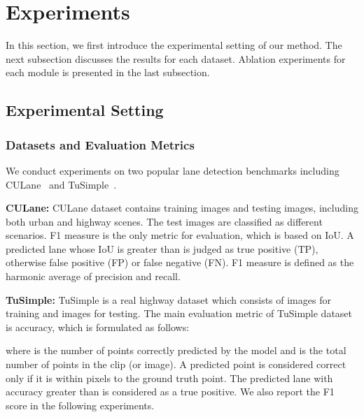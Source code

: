 \documentclass[10pt,twocolumn,letterpaper]{article}
\begin{document}
\section{Experiments}

In this section, we first introduce the experimental setting of our method. The next subsection discusses the results for each dataset. Ablation experiments for each module is presented in the last subsection.
\subsection{Experimental Setting}
\subsubsection{Datasets and Evaluation Metrics}
We conduct experiments on two popular lane detection benchmarks including CULane~\cite{pan2018spatial} and TuSimple~\cite{Tusimple}.

\textbf{CULane:} CULane dataset contains  training images and  testing images, including both urban and highway scenes. The test images are classified as  different scenarios. F1 measure is the only metric for evaluation, which is based on IoU. A predicted lane whose IoU is greater than  is judged as true positive (TP), otherwise false positive (FP) or false negative (FN). F1 measure is defined as the harmonic average of precision and recall.

\textbf{TuSimple:} TuSimple is a real highway dataset which consists of  images for training and  images for testing. The main evaluation metric of TuSimple dataset is accuracy, which is formulated as follows:

where  is the number of points correctly predicted by the model and  is the total number of points in the clip (or image). A predicted point is considered correct only if it is within  pixels to the ground truth point. The predicted lane with accuracy greater than  is considered as a true positive. We also report the F1 score in the following experiments.

\begin{table}[!htbp]
    \centering
    \caption{Details of different versions of GANet.}
    \label{tab:version}
\end{table}
\end{document}
